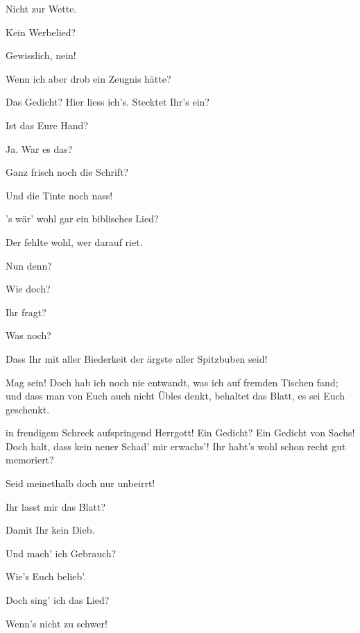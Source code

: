 \begin{drama}
\Sachsspeaks
Nicht zur Wette.

\Beckmesserspeaks
Kein Werbelied?

\Sachsspeaks
Gewisslich, nein!

\Beckmesserspeaks
Wenn ich aber drob ein Zeugnis hätte?



\Sachsspeaks


Das Gedicht? Hier liess ich's. Stecktet Ihr's ein?

\Beckmesserspeaks


Ist das Eure Hand?

\Sachsspeaks
Ja. War es das?

\Beckmesserspeaks
Ganz frisch noch die Schrift?

\Sachsspeaks
Und die Tinte noch nass!

\Beckmesserspeaks
's wär' wohl gar ein biblisches Lied?

\Sachsspeaks
Der fehlte wohl, wer darauf riet.

\Beckmesserspeaks
Nun denn?

\Sachsspeaks
Wie doch?

\Beckmesserspeaks
Ihr fragt?

\Sachsspeaks
Was noch?

\Beckmesserspeaks
Dass Ihr mit aller Biederkeit
der ärgste aller Spitzbuben seid!

\Sachsspeaks
Mag sein! Doch hab ich noch nie entwandt,
was ich auf fremden Tischen fand;
und dass man von Euch auch nicht Übles denkt,
behaltet das Blatt, es sei Euch geschenkt.

\Beckmesserspeaks
in freudigem Schreck aufspringend
Herrgott! 
Ein Gedicht? Ein Gedicht von Sachs!
Doch halt, dass kein neuer Schad' mir erwachs'!
Ihr habt's wohl schon recht gut memoriert?

\Sachsspeaks
Seid meinethalb doch nur unbeirrt!

\Beckmesserspeaks
Ihr lasst mir das Blatt?

\Sachsspeaks
Damit Ihr kein Dieb.

\Beckmesserspeaks
Und mach' ich Gebrauch?

\Sachsspeaks
Wie's Euch belieb'.

\Beckmesserspeaks
Doch sing' ich das Lied?

\Sachsspeaks
Wenn's nicht zu schwer!


\end{drama}

